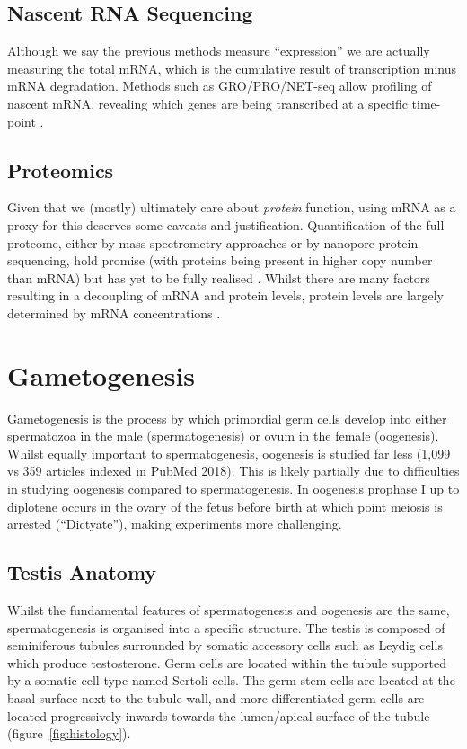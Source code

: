 \subsection{Nascent RNA Sequencing}
Although we say the previous methods measure ``expression'' we are actually measuring the total mRNA, which is the cumulative result of transcription minus mRNA degradation.
Methods such as GRO/PRO/NET-seq allow profiling of nascent mRNA, revealing which genes are being transcribed at a specific time-point \parencite{Core2008Nascent, Churchman2011Nascent, Mahat2016Basepairresolution}.


\subsection{Proteomics}
Given that we (mostly) ultimately care about \emph{protein} function, using mRNA as a proxy for this deserves some caveats and justification.
Quantification of the full proteome, either by mass-spectrometry approaches or by nanopore protein sequencing, hold promise (with proteins being present in higher copy number than mRNA) but has yet to be fully realised \parencite[Reviewed in][]{Specht2018Transformative,Marx2019dream}.
Whilst there are many factors resulting in a decoupling of mRNA and protein levels, protein levels are largely determined by mRNA concentrations \parencite[Reviewed in][]{Liu2016Dependency}.






\section{Gametogenesis}
Gametogenesis is the process by which primordial germ cells develop into either spermatozoa in the male (spermatogenesis) or ovum in the female (oogenesis).
Whilst equally important to spermatogenesis, oogenesis is studied far less (1,099 vs 359 articles indexed in PubMed 2018).
This is likely partially due to difficulties in studying oogenesis compared to spermatogenesis.
In oogenesis prophase I up to diplotene occurs in the ovary of the fetus before birth at which point meiosis is arrested (``Dictyate''), making experiments more challenging.

\subsection{Testis Anatomy}
Whilst the fundamental features of spermatogenesis and oogenesis are the same, spermatogenesis is organised into a specific structure.
The testis is composed of seminiferous tubules surrounded by somatic accessory cells such as Leydig cells which produce testosterone.
Germ cells are located within the tubule supported by a somatic cell type named Sertoli cells.
The germ stem cells are located at the basal surface next to the tubule wall, and more differentiated germ cells are located progressively inwards towards the lumen/apical surface of the tubule (figure~\ref{fig:histology}).

